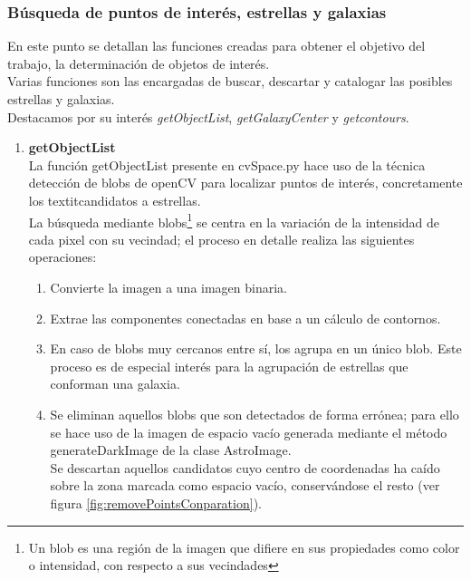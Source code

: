 	\subsubsection{Búsqueda de puntos de interés, estrellas y galaxias}
	En este punto se detallan las funciones creadas para obtener el objetivo del trabajo, la determinación de objetos de interés.
	\\Varias funciones son las encargadas de buscar, descartar y catalogar las posibles estrellas y galaxias.\\
	Destacamos por su interés \emph{getObjectList}, \emph{getGalaxyCenter} y \emph{getcontours}.\\
	\begin{enumerate}
	\item \textbf{getObjectList}\\
	La función getObjectList presente en cvSpace.py hace uso de la técnica detección de blobs de openCV para localizar puntos de interés, concretamente los textit{candidatos a estrellas}.\\
	La búsqueda mediante blobs\footnote{Un blob es una región de la imagen que difiere en sus propiedades como color o intensidad, con respecto a sus vecindades} se centra en la variación de la intensidad de cada pixel con su vecindad; el proceso en detalle realiza las siguientes operaciones:
	\begin{enumerate}
		\item Convierte la imagen a una imagen binaria.
		\item Extrae las componentes conectadas en base a un cálculo de contornos.
		\item En caso de blobs muy cercanos entre sí, los agrupa en un único blob. Este proceso  es de especial interés para la agrupación de estrellas que conforman una galaxia.
		\item Se eliminan aquellos blobs que son detectados de forma errónea; para ello se hace uso de la imagen de espacio vacío generada mediante el método {\scriptsize generateDarkImage} de la clase AstroImage.\\
		Se descartan aquellos candidatos cuyo centro de coordenadas ha caído sobre la zona marcada como espacio vacío, conservándose el resto (ver figura \ref{fig:removePointsConparation}).
		\begin{figure}[!htb]
			\centering

\end{figure}
\end{enumerate}
\end{enumerate}
